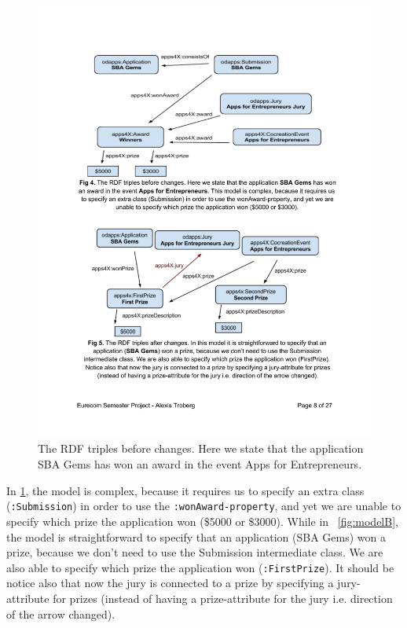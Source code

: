 \begin{figure}[!htbp]

\includegraphics[]{img/rdfTriplesBeforeChanges.pdf}
\caption{The RDF triples before changes. Here we state that the application SBA Gems has won an award in the event Apps for Entrepreneurs. }
\label{fig:modelA}
\end{figure}

In \ref{fig:modelA}, the model is complex, because it requires us to specify an extra class (\texttt{:Submission}) in order to use the \texttt{:wonAward-property}, and yet we are unable to specify which prize the application won (\$5000 or \$3000). While in ~\ref{fig:modelB}, the model is straightforward to specify that an application (SBA Gems) won a prize, because we don't need to use the Submission intermediate class. We are also able to specify which prize the application won (\texttt{:FirstPrize}). It should be notice  also that now the jury is connected to a prize by specifying a jury-attribute for prizes (instead of having a prize-attribute for the jury i.e. direction of the arrow changed).

